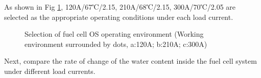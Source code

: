 As shown in Fig \ref{fig:figure9}, 120A/67℃/2.15, 210A/68℃/2.15, 300A/70℃/2.05 are selected as the appropriate operating conditions under each load current.
\begin{figure}
	\label{fig:figure9}
	\caption{Selection of fuel cell OS operating environment (Working environment surrounded by dots, a:120A; b:210A; c:300A)}
\end{figure}
Next, compare the rate of change of the water content inside the fuel cell system under different load currents.

